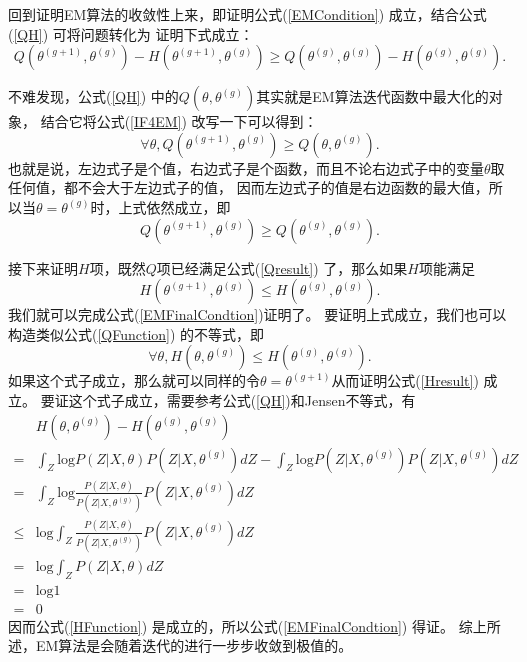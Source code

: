 \documentclass[UTF8]{ctexart}
\begin{document}
回到证明EM算法的收敛性上来，即证明公式(\ref{EMCondition}) 成立，结合公式(\ref{QH}) 可将问题转化为
证明下式成立：
\begin{equation}\label{EMFinalCondtion}
  Q \left(\theta^{(g+1)},\theta^{(g)}\right) - H\left(\theta^{(g+1)}, \theta^{(g)}\right) \ge Q\left(\theta^{(g)},\theta^{(g)}\right) - H\left(\theta^{(g)},\theta^{(g)}\right).
\end{equation}

不难发现，公式(\ref{QH}) 中的$Q\left(\theta,\theta^{(g)}\right)$其实就是EM算法迭代函数中最大化的对象，
结合它将公式(\ref{IF4EM}) 改写一下可以得到：
\begin{equation}\label{QFunction}
  \forall \theta, Q \left(\theta^{(g+1)},\theta^{(g)}\right) \ge Q\left(\theta,\theta^{(g)}\right).
\end{equation}
也就是说，左边式子是个值，右边式子是个函数，而且不论右边式子中的变量$\theta$取任何值，都不会大于左边式子的值，
因而左边式子的值是右边函数的最大值，所以当$\theta = \theta^{(g)}$时，上式依然成立，即
\begin{equation}\label{Qresult}
  Q \left(\theta^{(g+1)},\theta^{(g)}\right) \ge Q\left(\theta^{(g)},\theta^{(g)}\right).
\end{equation}

接下来证明$H$项，既然$Q$项已经满足公式(\ref{Qresult}) 了，那么如果$H$项能满足
\begin{equation}\label{Hresult}
  H \left(\theta^{(g+1)},\theta^{(g)}\right) \le H\left(\theta^{(g)},\theta^{(g)}\right).
\end{equation}
我们就可以完成公式(\ref{EMFinalCondtion})证明了。
要证明上式成立，我们也可以构造类似公式(\ref{QFunction}) 的不等式，即
\begin{equation}\label{HFunction}
  \forall \theta, H\left(\theta,\theta^{(g)}\right) \le H \left(\theta^{(g)},\theta^{(g)}\right).
\end{equation}
如果这个式子成立，那么就可以同样的令$\theta = \theta^{(g+1)}$从而证明公式(\ref{Hresult}) 成立。
要证这个式子成立，需要参考公式(\ref{QH})和Jensen不等式，有
\begin{equation}\label{HProve}
  \begin{split}
    & H \left(\theta,\theta^{(g)}\right) - H \left(\theta^{(g)},\theta^{(g)}\right)\\
    =& \int_{Z}\mathrm{log}P(Z|X,\theta)P\left(Z|X,\theta^{(g)}\right)dZ - \int_{Z}\mathrm{log}P(Z|X,\theta^{(g)})P\left(Z|X,\theta^{(g)}\right)dZ\\
    =& \int_{Z}\mathrm{log}\frac{P(Z|X,\theta)}{P\left(Z|X,\theta^{(g)}\right)}P\left(Z|X,\theta^{(g)}\right)dZ\\
    \le& \mathrm{log}\int_{Z}\frac{P(Z|X,\theta)}{P\left(Z|X,\theta^{(g)}\right)}P\left(Z|X,\theta^{(g)}\right)dZ\\
    =& \mathrm{log}\int_{Z}P(Z|X,\theta)dZ\\
    =& \mathrm{log}1\\
    =& 0
  \end{split}
\end{equation}
因而公式(\ref{HFunction}) 是成立的，所以公式(\ref{EMFinalCondtion}) 得证。
综上所述，EM算法是会随着迭代的进行一步步收敛到极值的。
\end{document}
